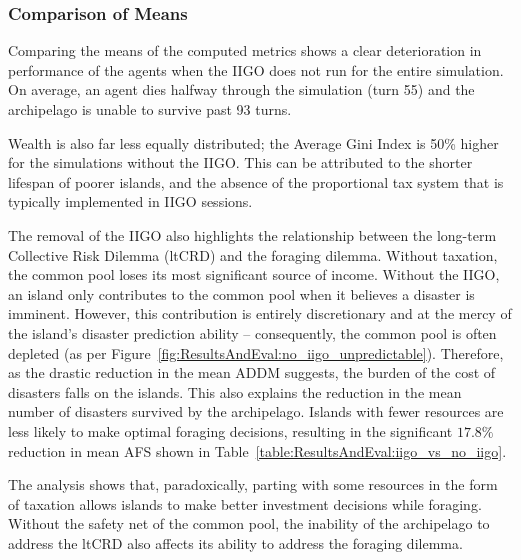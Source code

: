 \subsubsection{Comparison of Means}
\label{subsec:ResultsAndEval:no-iigo:comparison_of_means}
Comparing the means of the computed metrics shows a clear deterioration in performance of the agents when the IIGO does not run for the entire simulation. 
On average, an agent dies halfway through the simulation (turn 55) and the archipelago is unable to survive past 93 turns. 

Wealth is also far less equally distributed; the Average Gini Index is 50\% higher for the simulations without the IIGO. This can be attributed to the shorter lifespan of poorer islands, and the absence of the proportional tax system that is typically implemented in IIGO sessions. 

The removal of the IIGO also highlights the relationship between the long-term Collective Risk Dilemma (ltCRD) and the foraging dilemma. Without taxation, the common pool loses its most significant source of income. 
Without the IIGO, an island only contributes to the common pool when it believes a disaster is imminent. However, this contribution is entirely discretionary and at the mercy of the island's disaster prediction ability -- consequently, the common pool is often depleted (as per Figure~\ref{fig:ResultsAndEval:no_iigo_unpredictable}). 
Therefore, as the drastic reduction in the mean ADDM suggests, the burden of the cost of disasters falls on the islands. This also explains the reduction in the mean number of disasters survived by the archipelago. Islands with fewer resources are less likely to make optimal foraging decisions, resulting in the significant $17.8\%$ reduction in mean AFS shown in Table~\ref{table:ResultsAndEval:iigo_vs_no_iigo}.

The analysis shows that, paradoxically, parting with some resources in the form of taxation allows islands to make better investment decisions while foraging. Without the safety net of the common pool, the inability of the archipelago to address the ltCRD also affects its ability to address the foraging dilemma.


